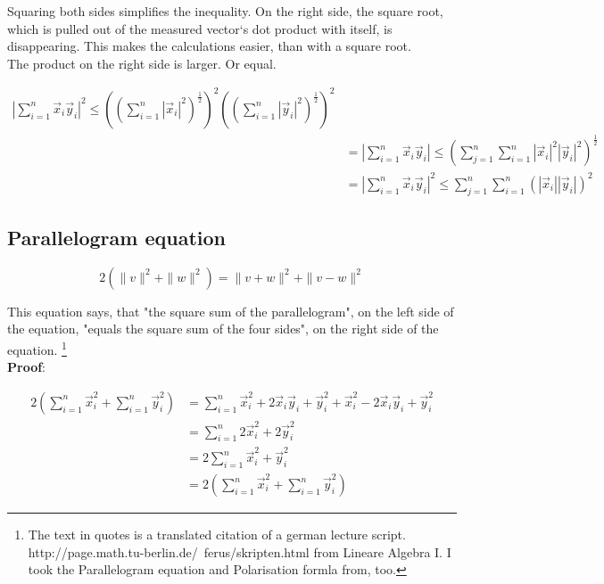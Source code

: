 \documentclass[a4paper]{article}
\begin{document}
Squaring both sides simplifies the inequality. On the right side, the square root, which is pulled out of the measured vector`s dot product with itself, is disappearing. This makes the calculations easier, than with a square root.\\

The product on the right side is larger. Or equal. 

\begin{displaymath}
\begin{align}    
    |\sum_{i=1}^{n}\vec{x}_{i}\vec{y}_{i}|^{2} \leq ((\sum_{i=1}^{n}|\vec{x}_{i}|^{2})^{\frac{1}{2}})^{2}((\sum_{i=1}^{n}|\vec{y}_{i}|^{2})^{\frac{1}{2}})^{2}\\
    &= |\sum_{i=1}^{n}\vec{x}_{i}\vec{y}_{i}| \leq (\sum_{j=1}^{n}\sum_{i=1}^{n}|\vec{x}_{i}|^{2}|\vec{y}_{i}|^{2})^{\frac{1}{2}}\\
&=
|\sum_{i=1}^{n}\vec{x}_{i}\vec{y}_{i}|^{2} \leq \sum_{j=1}^{n}\sum_{i=1}^{n}(|\vec{x}_{i}||\vec{y}_{i}|)^{2}
\end{align}
\end{displaymath}

\subsection{Parallelogram equation}

\begin{displaymath}
2(\|v\|^{2} + \|w\|^{2}) = \|v+w\|^{2}+\|v-w\|^{2}
\end{displaymath}

This equation says, that "the square sum of the parallelogram", on the left side of the equation, "equals the square sum of the four sides", on the right side of the equation. \footnote{The text in quotes is a translated citation of a german lecture script. http://page.math.tu-berlin.de/~ferus/skripten.html from Lineare Algebra I. I took the Parallelogram equation and Polarisation formla from, too.}\\

\textbf{Proof}:

\begin{displaymath}
\begin{align}
2(\sum_{i=1}^{n}\vec{x}_{i}^{2} + \sum_{i=1}^{n}\vec{y}_{i}^{2}) &= \sum_{i=1}^{n}\vec{x}_{i}^{2}+2\vec{x}_{i}\vec{y}_{i}+\vec{y}_{i}^{2}+\vec{x}_{i}^{2}-2\vec{x}_{i}\vec{y}_{i}+\vec{y}_{i}^{2}\\
&= \sum_{i=1}^{n}2\vec{x}_{i}^{2}+2\vec{y}_{i}^2\\ 
&= 2\sum_{i=1}^{n}\vec{x}_{i}^{2}+\vec{y}_{i}^{2} \\
&= 2(\sum_{i=1}^{n}\vec{x}_{i}^{2} + \sum_{i=1}^{n}\vec{y}_{i}^{2})
\end{align}
\end{displaymath}
\end{document}
